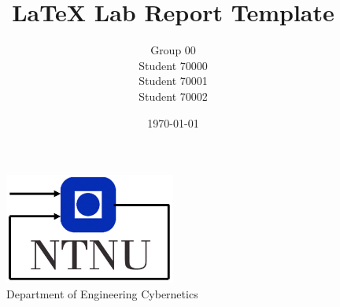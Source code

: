 \documentclass[11pt, a4paper, USenglish]{article} %
\begin{document}

\title{LaTeX Lab Report Template}
\author{Group 00\\Student 70000\\Student 70001\\Student 70002}
\date{\today}
\begin{titlepage}
    \maketitle
    \begin{figure}
    \centering
    \includegraphics[width=0.5\textwidth]{figures/logo/itk_ntnu.jpg}\\
    Department of Engineering Cybernetics
    \end{figure}
    \thispagestyle{empty}
\end{titlepage}
\setlength\parindent{0pt}

\newpage



\newpage
\tableofcontents


\newpage

\newpage



\newpage
{}
\setcounter{page}{1}







\newpage
{}
\printglossary[type=\acronymtype,title=Abbreviations]
\printglossary[title=Nomenclature]

\newpage
{}
\printbibliography{}
\label{sec:bibliography}
\end{document}
